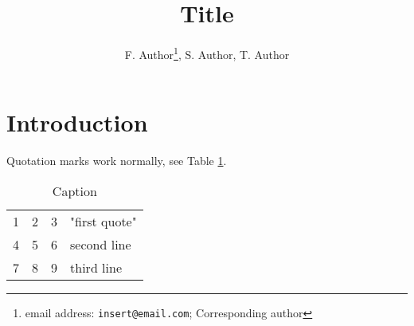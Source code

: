\documentclass[12pt, letterpaper]{article}
\title{Title}
\author{F. Author\thanks{email address: \texttt{insert@email.com}; Corresponding author}, S. Author, T. Author}
\date{}
\newcommand{\beginsupplement}{%
        \setcounter{table}{0}
        \renewcommand{\thetable}{S\arabic{table}}%
        \setcounter{figure}{0}
        \renewcommand{\thefigure}{S\arabic{figure}}%
     }
\begin{document}
\maketitle

\begin{abstract}
    \noindent \lipsum[1]
\end{abstract}

\section{Introduction}

\lipsum[2]

Quotation marks work normally, see Table \ref{tab:example}.


\begin{table}[h]
    \centering
    \caption{Caption}
    \begin{tabular}{ l | c | r | p{3cm}}
        \hline			
        1 & 2 & 3 & "first quote" \\
        4 & 5 & 6 & second line \\
        7 & 8 & 9 & third line \\
        \hline  
    \end{tabular}
    \label{tab:example}
\end{table}


\iffalse

\begin{figure}
    \centering
    \texttt{[image: figures/]}
    \caption{Caption}
    \label{fig:example}
\end{figure}

\fi

\printbibliography

\beginsupplement

\end{document}
